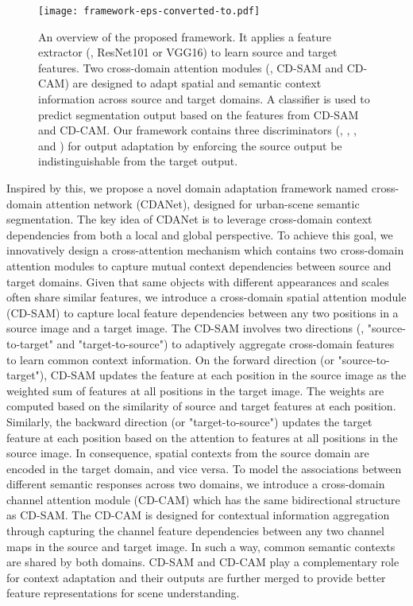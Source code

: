 \documentclass[10pt,twocolumn,letterpaper]{article}
\begin{document}
	\begin{figure*}
		\begin{center}
\texttt{[image: framework-eps-converted-to.pdf]}
		\end{center}
		\caption{An overview of the proposed framework. It applies a feature extractor (\ie, ResNet101 or VGG16) to learn source and target features. Two cross-domain attention modules (\ie, CD-SAM and CD-CAM) are designed to adapt spatial and semantic context information across source and target domains. A classifier  is used to predict segmentation output based on the features from CD-SAM and CD-CAM. Our framework contains three discriminators (\ie, , , and ) for output adaptation by enforcing the source output be indistinguishable from the target output.}
		\label{fig:framework}
		\vspace{-0.2in}
	\end{figure*}


	Inspired by this, we propose a novel domain adaptation framework named cross-domain attention network (CDANet), designed for urban-scene semantic segmentation. The key idea of CDANet is to leverage cross-domain context dependencies from both a local and global perspective. To achieve this goal, we innovatively design a cross-attention mechanism which contains two cross-domain attention modules to capture mutual context dependencies between source and target domains. Given that same objects with different appearances and scales often share similar features, we introduce a cross-domain spatial attention module (CD-SAM) to capture local feature dependencies between any two positions in a source image and a target image. The CD-SAM involves two directions (\ie, "source-to-target" and "target-to-source") to adaptively aggregate cross-domain features to learn common context information. On the forward direction (or "source-to-target"), CD-SAM updates the feature at each position in the source image as the weighted sum of features at all positions in the target image. The weights are computed based on the similarity of source and target features at each position. Similarly, the backward direction (or "target-to-source") updates the target feature at each position based on the attention to features at all positions in the source image. In consequence, spatial contexts from the source domain are encoded in the target domain, and vice versa. To model the associations between different semantic responses across two domains, we introduce a cross-domain channel attention module (CD-CAM) which has the same bidirectional structure as CD-SAM. The CD-CAM is designed for contextual information aggregation through capturing the channel feature dependencies between any two channel maps in the source and target image. In such a way, common semantic contexts are shared by both domains. CD-SAM and CD-CAM play a complementary role for context adaptation and their outputs are further merged to provide better feature representations for scene understanding.
\end{document}

